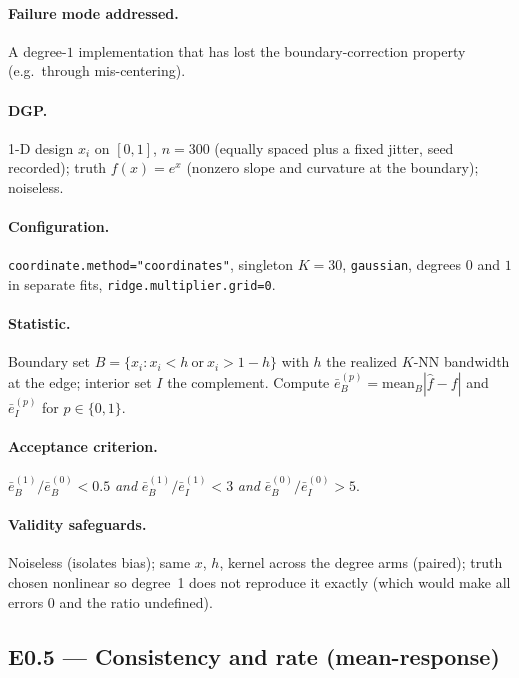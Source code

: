 \documentclass[11pt]{article}
\newcommand{\code}[1]{\texttt{#1}}
\begin{document}
\paragraph{Failure mode addressed.} A degree-$1$ implementation that has lost the
boundary-correction property (e.g.\ through mis-centering).

\paragraph{DGP.} 1-D design $x_i$ on $[0,1]$, $n=300$ (equally spaced plus a fixed jitter,
seed recorded); truth $f(x)=e^{x}$ (nonzero slope and curvature at the boundary); noiseless.

\paragraph{Configuration.} \code{coordinate.method="coordinates"}, singleton $K=30$,
\code{gaussian}, degrees $0$ and $1$ in separate fits, \code{ridge.multiplier.grid=0}.

\paragraph{Statistic.} Boundary set $B=\{x_i: x_i< h\ \text{or}\ x_i>1-h\}$ with $h$ the
realized $K$-NN bandwidth at the edge; interior set $I$ the complement. Compute
$\bar e_B^{(p)}=\mathrm{mean}_{B}|\hat f-f|$ and $\bar e_I^{(p)}$ for $p\in\{0,1\}$.

\paragraph{Acceptance criterion.} $\bar e_B^{(1)}/\bar e_B^{(0)} < 0.5$ \emph{and}
$\bar e_B^{(1)}/\bar e_I^{(1)} < 3$ \emph{and} $\bar e_B^{(0)}/\bar e_I^{(0)} > 5$.

\paragraph{Validity safeguards.} Noiseless (isolates bias); same $x$, $h$, kernel across the
degree arms (paired); truth chosen nonlinear so degree~1 does not reproduce it exactly (which
would make all errors $0$ and the ratio undefined).

\subsection{E0.5 — Consistency and rate (mean-response)}
\end{document}
